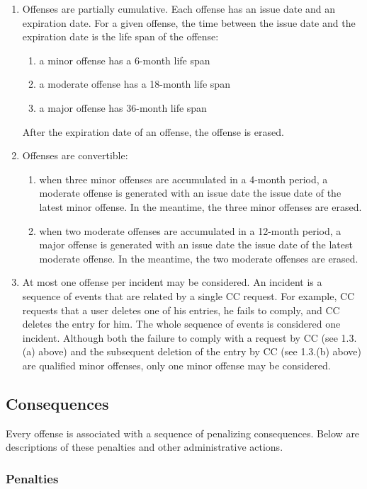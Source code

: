 \begin{enumerate}
\item Offenses are partially cumulative. Each offense has an issue date and an expiration date. For a given offense, the time between the issue date and the expiration date is the life span of the offense:
\begin{enumerate}
\item a minor offense has a 6-month life span
\item a moderate offense has a 18-month life span
\item a major offense has 36-month life span
\end{enumerate}
After the expiration date of an offense, the offense is erased.
\item Offenses are convertible:
\begin{enumerate}
\item when three minor offenses are accumulated in a 4-month period, a moderate offense is generated with an issue date the issue date of the latest minor offense. In the meantime, the three minor offenses are erased.
\item when two moderate offenses are accumulated in a 12-month period, a major offense is generated with an issue date the issue date of the latest moderate offense. In the meantime, the two moderate offenses are erased.
\end{enumerate}
\item At most one offense per incident may be considered. An incident is a sequence of events that are related by a single CC request. For example, CC requests that a user deletes one of his entries, he fails to comply, and CC deletes the entry for him. The whole sequence of events is considered one incident. Although both the failure to comply with a request by CC (see 1.3.(a) above) and the subsequent deletion of the entry by CC (see 1.3.(b) above) are qualified minor offenses, only one minor offense may be considered.
\end{enumerate}

\subsection*{Consequences}

Every offense is associated with a sequence of penalizing consequences. Below are descriptions of these penalties and other administrative actions.

\subsubsection*{Penalties}

